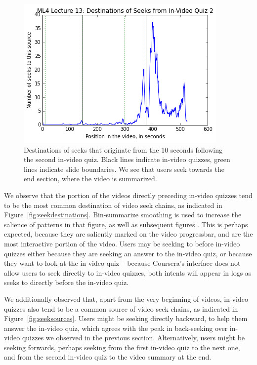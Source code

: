 \documentclass[letterpaper]{article}
\begin{document}
\begin{figure}
\includegraphics[width=1.0\columnwidth]{seekdest2}
\caption{Destinations of seeks that originate from the 10 seconds following the second in-video quiz. Black lines indicate in-video quizzes, green lines indicate slide boundaries. We see that users seek towards the end section, where the video is summarized.}
\label{fig:seekdest2}
\end{figure}

We observe that the portion of the videos directly preceding in-video quizzes tend to be the most common destination of video seek chains, as indicated in Figure~\ref{fig:seekdestinations}. Bin-summarize smoothing is used to increase the salience of patterns in that figure, as well as subsequent figures \cite{smoothing}. This is perhaps expected, because they are saliently marked on the video progressbar, and are the most interactive portion of the video. Users may be seeking to before in-video quizzes either because they are seeking an answer to the in-video quiz, or because they want to look at the in-video quiz -- because Coursera's interface does not allow users to seek directly to in-video quizzes, both intents will appear in logs as seeks to directly before the in-video quiz.

We additionally observed that, apart from the very beginning of videos, in-video quizzes also tend to be a common source of video seek chains, as indicated in Figure~\ref{fig:seeksources}. Users might be seeking directly backward, to help them answer the in-video quiz, which agrees with the peak in back-seeking over in-video quizzes we observed in the previous section. Alternatively, users might be seeking forwards, perhaps seeking from the first in-video quiz to the next one, and from the second in-video quiz to the video summary at the end.
\end{document}
